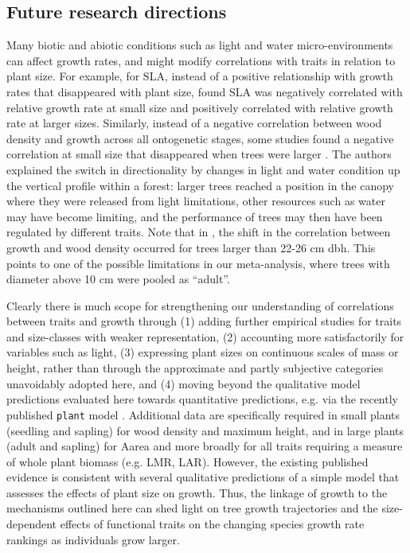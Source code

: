 \documentclass[a4paper,11pt]{article}
\begin{document}
\subsection*{Future research directions}

Many biotic and abiotic conditions such as light and water micro-environments can affect growth rates, and might modify correlations with traits in relation to plant size. For example, for SLA, instead of a positive relationship with growth rates that disappeared with plant size, \citet{Iida:2014ep} found SLA was negatively correlated with relative growth rate at small size and positively correlated with relative growth rate at larger sizes. Similarly, instead of a negative correlation between wood density and growth across all ontogenetic stages, some studies found a negative correlation at small size that disappeared when trees were larger \citep{Iida:2014ep,Iida:2014hq}. The authors explained the switch in directionality by changes in light and water condition up the vertical profile within a forest: larger trees reached a position in the canopy where they were released from light limitations, other resources such as water may have become limiting, and the performance of trees may then have been regulated by different traits. Note that in \citet{Iida:2014hq}, the shift in the correlation between growth and wood density occurred for trees larger than 22-26 cm dbh. This points to one of the possible limitations in our meta-analysis, where trees with diameter above 10 cm were pooled as ``adult''.

Clearly there is much scope for strengthening our understanding of correlations between traits and growth through (1) adding further empirical studies for traits and size-classes with weaker representation, (2) accounting more satisfactorily for variables such as light, (3) expressing plant sizes on continuous scales of mass or height, rather than through the approximate and partly subjective categories unavoidably adopted here, and (4) moving beyond the qualitative model predictions evaluated here towards quantitative predictions, e.g. via the recently published \texttt{plant} model \citep{Falster-2016}. Additional data are specifically required in small plants (seedling and sapling) for wood density and maximum height, and in large plants (adult and sapling) for Aarea and more broadly for all traits requiring a measure of whole plant biomass (e.g. LMR, LAR). However, the existing published evidence is consistent with several qualitative predictions of a simple model that assesses the effects of plant size on growth. Thus, the linkage of growth to the mechanisms outlined here can shed light on tree growth trajectories and the size-dependent effects of functional traits on the changing species growth rate rankings as individuals grow larger.
\end{document}
